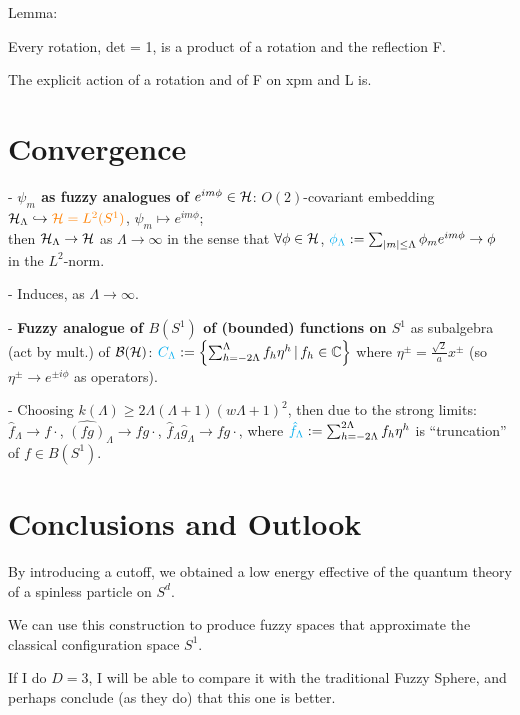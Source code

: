 \linea

Lemma:

Every rotation, det = 1, is a product of a rotation and the reflection F.

The explicit action of a rotation and of F on xpm and L is.



\section{Convergence}

{
    \color{gray}
    
    - \textbf{$\psi_m$ as fuzzy analogues of $e^{i m \phi} \in \hcal$}: $O(2)$-covariant embedding $\mathcal H_\Lambda \hookrightarrow \textcolor{orange}{\mathcal H = L^2(S^1)}$, $\psi_m \mapsto e^{im\phi}$; \hfill \\then $\mathcal H_\Lambda \to \mathcal H$ as $\Lambda \to \infty$ in the sense that $\forall \phi \in \hcal$, $\lbtext{\phi_\Lambda} := \sum_{|m| \leq \Lambda} \phi_m e^{im\phi} \to \phi$ in the $L^2$-norm.
    
    - Induces,  as $\Lambda \to \infty$.
    
    - \textbf{Fuzzy analogue of $B(S^1)$ of (bounded) functions on $S^1$} as subalgebra (act by mult.) of $\mathcal B(\mathcal H)$: $\textcolor{cyan}{C_\Lambda} := \left\{ \sum_{h = -2\Lambda}^\Lambda f_h \eta^h \,|\, f_h \in \mathbb{C}\right\}$ where $\eta^\pm  = \frac{\sqrt{2}}{a}x^\pm$ (so $\eta^\pm \to e^{\pm i \phi}$ as operators).
    
    - Choosing $k(\Lambda) \geq 2 \Lambda(\Lambda + 1)(w\Lambda+1)^2$, then  due to the strong limits: $\hat f_\Lambda \to f\cdot$, $\hat{(fg)}_\Lambda \to fg\cdot $, $\hat f_\Lambda \hat g_\Lambda \to fg\cdot$, where $\textcolor{cyan}{\hat f_\Lambda} := \sum_{h = -2\Lambda}^{2\Lambda} f_h \eta^h$ is ``truncation'' of $f \in B(S^1)$.
    
}

\linea

\section{Conclusions and Outlook}

{\color{gray}

    By introducing a cutoff, we obtained a low energy effective of the quantum theory of a spinless particle on $S^d$.
    
    We can use this construction to produce fuzzy spaces that approximate the classical configuration space $S^1$.
    
    If I do $D = 3$, I will be able to compare it with the traditional Fuzzy Sphere, and perhaps conclude (as they do) that this one is better.
}